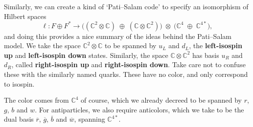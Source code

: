 \documentclass[12pt]{article}
\newcommand{\maps}{\colon}    %
\newcommand{\C}{{\mathbb C}}  %
\newcommand{\rbar}{{\overline{r}}} %
\newcommand{\gbar}{{\overline{g}}} %
\newcommand{\bbar}{{\overline{b}}} %
\newcommand{\wbar}{{\overline{w}}} %
\newcommand{\define}[1]{{\bf #1}}
\begin{document}
Similarly, we can create a kind of `Pati--Salam code' to specify an 
isomorphism of Hilbert spaces
\[  \ell \maps F
\oplus F^* \to \big((\C^2 \otimes \C) \; \oplus \; (\C \otimes \C^2)\big) \;
\otimes \; \big(\C^4 \; \oplus \; \C^{4*}\big), \]
and doing this provides a nice
summary of the ideas behind the Pati--Salam model. We take the space
$\C^2 \otimes \C$ to be spanned by $u_L$ and $d_L$, the \define{left-isospin
up} and \define{left-isospin down} states. Similarly, the space $\C \otimes
\C^2$ has basis $u_R$ and $d_R$, called \define{right-isospin up} and
\define{right-isospin down}. Take care not to confuse these with the similarly
named quarks. These have no color, and only correspond to isospin.

The color comes from $\C^4$ of course, which we already decreed to be spanned
by $r$, $g$, $b$ and $w$. For antiparticles, we also require anticolors, which
we take to be the dual basis $\rbar$, $\gbar$, $\bbar$ and $\wbar$, spanning
$\C^{4*}$.
\end{document}
